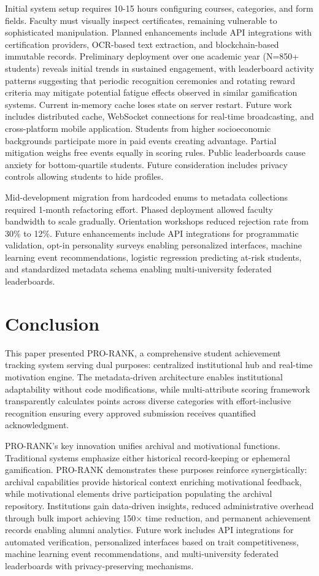 \documentclass[12pt]{article}
\begin{document}
Initial system setup requires 10-15 hours configuring courses, categories, and form fields. Faculty must visually inspect certificates, remaining vulnerable to sophisticated manipulation. Planned enhancements include API integrations with certification providers, OCR-based text extraction, and blockchain-based immutable records. Preliminary deployment over one academic year (N=850+ students) reveals initial trends in sustained engagement, with leaderboard activity patterns suggesting that periodic recognition ceremonies and rotating reward criteria may mitigate potential fatigue effects observed in similar gamification systems. Current in-memory cache loses state on server restart. Future work includes distributed cache, WebSocket connections for real-time broadcasting, and cross-platform mobile application. Students from higher socioeconomic backgrounds participate more in paid events creating advantage. Partial mitigation weighs free events equally in scoring rules. Public leaderboards cause anxiety for bottom-quartile students. Future consideration includes privacy controls allowing students to hide profiles.

Mid-development migration from hardcoded enums to metadata collections required 1-month refactoring effort. Phased deployment allowed faculty bandwidth to scale gradually. Orientation workshops reduced rejection rate from 30\% to 12\%. Future enhancements include API integrations for programmatic validation, opt-in personality surveys enabling personalized interfaces, machine learning event recommendations, logistic regression predicting at-risk students, and standardized metadata schema enabling multi-university federated leaderboards.



\section{Conclusion}

This paper presented PRO-RANK, a comprehensive student achievement tracking system serving dual purposes: centralized institutional hub and real-time motivation engine. The metadata-driven architecture enables institutional adaptability without code modifications, while multi-attribute scoring framework transparently calculates points across diverse categories with effort-inclusive recognition ensuring every approved submission receives quantified acknowledgment.

PRO-RANK's key innovation unifies archival and motivational functions. Traditional systems emphasize either historical record-keeping or ephemeral gamification. PRO-RANK demonstrates these purposes reinforce synergistically: archival capabilities provide historical context enriching motivational feedback, while motivational elements drive participation populating the archival repository. Institutions gain data-driven insights, reduced administrative overhead through bulk import achieving 150× time reduction, and permanent achievement records enabling alumni analytics. Future work includes API integrations for automated verification, personalized interfaces based on trait competitiveness, machine learning event recommendations, and multi-university federated leaderboards with privacy-preserving mechanisms.
\end{document}
